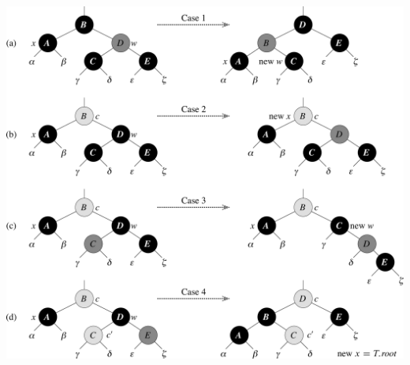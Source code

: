 \documentclass{beamer}
\newcommand{\sect}[1]{
\section{#1}
\begin{frame}[fragile]\frametitle{#1}
}
\begin{document}
\sect{}
\includegraphics[height=0.9\textheight]{Fig-13-7.pdf}
\end{frame}
\end{document}
